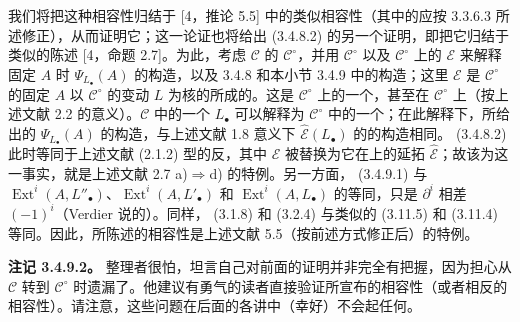 我们将把这种相容性归结于 [4，推论 5.5] 中的类似相容性（其中的应按 3.3.6.3 所述修正），从而证明它；这一论证也将给出 (3.4.8.2) 的另一个证明，即把它归结于类似的陈述 [4，命题 2.7]。为此，考虑 $\mathcal C$ 的 $\mathcal C^\circ$，并用 $\mathcal C^\circ$ 以及 $\mathcal C^\circ$ 上的 $\mathcal E$ 来解释固定 $A$ 时 $\Psi_{L_\bullet}(A)$ 的构造，以及 3.4.8 和本小节 3.4.9 中的构造；这里 $\mathcal E$ 是 $\mathcal C^\circ$ 的固定 $A$ 以 $\mathcal C^\circ$ 的变动 $L$ 为核的所成的。这是 $\mathcal C^\circ$ 上的一个，甚至在 $\mathcal C^\circ$ 上（按上述文献 2.2 的意义）。$\mathcal C$ 中的一个 $L_\bullet$ 可以解释为
$\mathcal C^\circ$ 中的一个；在此解释下，所给出的 $\Psi_{L_\bullet}(A)$ 的构造，与上述文献 1.8 意义下 $\widehat{\mathcal E}(L_\bullet)$ 的的构造相同。 (3.4.8.2) 此时等同于上述文献 (2.1.2) 型的反，其中 $\mathcal E$ 被替换为它在上的延拓 $\widehat{\mathcal E}$；故该为这一事实，就是上述文献 2.7 a)$\Rightarrow$d) 的特例。另一方面， (3.4.9.1) 与 $\operatorname{Ext}^i(A,L''_\bullet)$、$\operatorname{Ext}^i(A,L'_\bullet)$ 和 $\operatorname{Ext}^i(A,L_\bullet)$ 的等同，只是 $\partial^i$ 相差 $(-1)^i$（Verdier 说的）。同样， (3.1.8) 和 (3.2.4) 与类似的 (3.11.5) 和 (3.11.4) 等同。因此，所陈述的相容性是上述文献 5.5（按前述方式修正后）的特例。

\textbf{注记 3.4.9.2。} 整理者很怕，坦言自己对前面的证明并非完全有把握，因为担心从 $\mathcal C$ 转到 $\mathcal C^\circ$ 时遗漏了。他建议有勇气的读者直接验证所宣布的相容性（或者相反的相容性）。请注意，这些问题在后面的各讲中（幸好）不会起任何。

